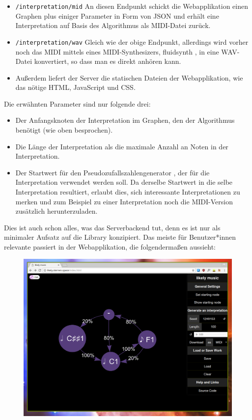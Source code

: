 \documentclass[a4paper,twocolumn]{article}
\begin{document}
\begin{itemize}
  \item \lstinline[basicstyle=\ttfamily]|/interpretation/mid| An diesen Endpunkt
    schickt die Webapplikation einen Graphen plus einiger Parameter in Form von JSON
    \cite{json} und erhält eine Interpretation auf Basis des Algorithmus als
    MIDI-Datei zurück.
  \item \lstinline[basicstyle=\ttfamily]|/interpretation/wav| Gleich wie der
    obige Endpunkt, allerdings wird vorher
    noch das MIDI mittels eines MIDI-Synthesizers, fluidsynth \cite{fluidsynth},
    in eine WAV-Datei konvertiert, so dass man es direkt anhören kann.
  \item Außerdem liefert der Server die statischen Dateien der Webapplikation, wie das
    nötige HTML, JavaScript und CSS.
\end{itemize}

Die erwähnten Parameter sind nur folgende drei:

\begin{itemize}
  \item Der Anfangsknoten der Interpretation im Graphen,
    den der Algorithmus benötigt (wie oben besprochen).
  \item Die Länge der Interpretation als die maximale Anzahl an Noten in der
    Interpretation.
  \item Der Startwert für den Pseudozufallszahlengenerator
    \cite{wikipedia_prng}, der für die Interpretation verwendet werden soll.
    Da derselbe Startwert in die selbe Interpretation resultiert, erlaubt dies,
    sich interessante Interpretationen zu merken und zum Beispiel zu einer
    Interpretation noch die MIDI-Version zusätzlich herunterzuladen.
\end{itemize}

Dies ist auch schon alles, was das Serverbackend tut, denn es ist nur als
minimaler Aufsatz auf die Library konzipiert. Das meiste für Benutzer*innen relevante
passiert in der Webapplikation, die folgendermaßen aussieht:

\begin{figure}[h]
  \includegraphics[width=.5\textwidth]{screenshots/start.png}
\end{figure}
\end{document}
